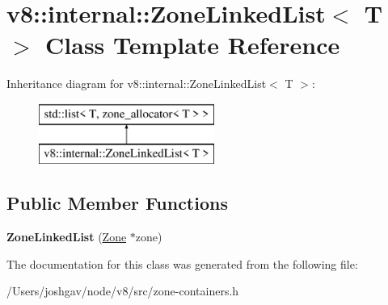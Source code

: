 \hypertarget{classv8_1_1internal_1_1_zone_linked_list}{}\section{v8\+:\+:internal\+:\+:Zone\+Linked\+List$<$ T $>$ Class Template Reference}
\label{classv8_1_1internal_1_1_zone_linked_list}
Inheritance diagram for v8\+:\+:internal\+:\+:Zone\+Linked\+List$<$ T $>$\+:\begin{figure}[H]
\begin{center}
\leavevmode
\includegraphics[height=2.000000cm]{classv8_1_1internal_1_1_zone_linked_list}
\end{center}
\end{figure}
\subsection*{Public Member Functions}
\begin{DoxyCompactItemize}
\item 
{\bfseries Zone\+Linked\+List} (\hyperlink{classv8_1_1internal_1_1_zone}{Zone} $\ast$zone)\hypertarget{classv8_1_1internal_1_1_zone_linked_list_aee153eb9aeca187ed7fd186943049462}{}\label{classv8_1_1internal_1_1_zone_linked_list_aee153eb9aeca187ed7fd186943049462}

\end{DoxyCompactItemize}


The documentation for this class was generated from the following file\+:\begin{DoxyCompactItemize}
\item 
/\+Users/joshgav/node/v8/src/zone-\/containers.\+h\end{DoxyCompactItemize}
